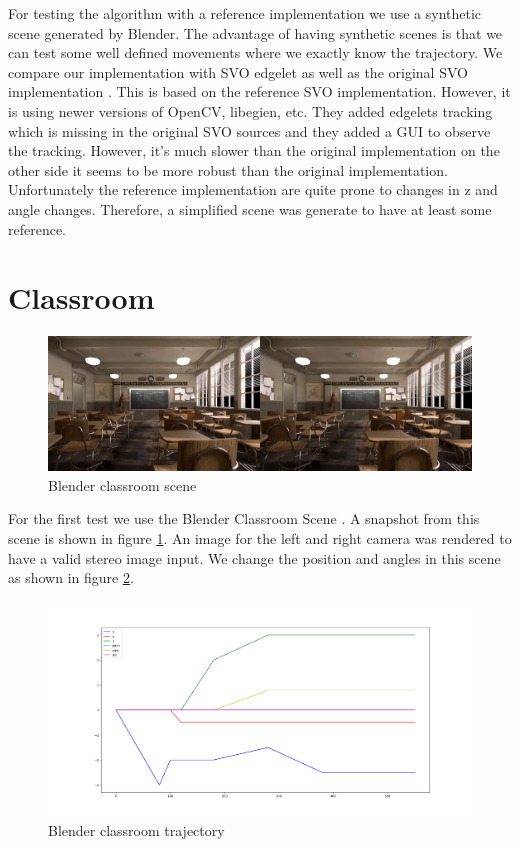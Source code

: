 \documentclass[11pt,a4paper,titlepage,oneside]{report}
\begin{document}
For testing the algorithm with a reference implementation we use a synthetic scene generated by Blender. The advantage of having synthetic scenes is that we can test some well defined movements where we exactly know the trajectory. We compare our implementation with SVO edgelet \cite{svo_edgled} as well as the original SVO implementation \cite{svo}. This is based on the reference SVO implementation. However, it is using newer versions of OpenCV, libegien, etc. They added edgelets tracking which is missing in the original SVO sources and they added a GUI to observe the tracking. However, it's much slower than the original implementation on the other side it seems to be more robust than the original implementation. Unfortunately the reference implementation are quite prone to changes in z and angle changes. Therefore, a simplified scene was generate to have at least some reference.

\section{Classroom}
\begin{figure}[H]
  \includegraphics[width=1.0\textwidth]{img/blender_classroom_scene.png}
  \caption{Blender classroom scene}\label{fig:blender_classroom_scene}
\end{figure}

For the first test we use the Blender Classroom Scene \cite{blender}. A snapshot from this scene is shown in figure \ref{fig:blender_classroom_scene}. An image for the left and right camera was rendered to have a valid stereo image input. We change the position and angles in this scene as shown in figure \ref{fig:blender_classroom_simple_traj}.

\begin{figure}[H]
  \includegraphics[width=1.0\textwidth]{img/blender_classroom_simple_traj.png}
  \caption{Blender classroom trajectory}\label{fig:blender_classroom_simple_traj}
\end{figure}
\end{document}
